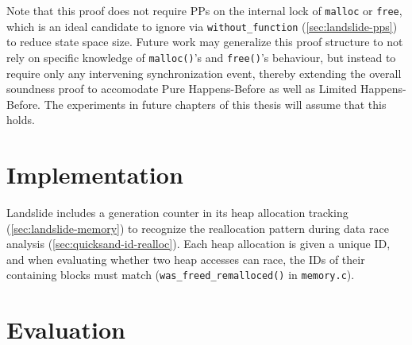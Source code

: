 Note that this proof does not require PPs on
the internal lock of {\tt malloc} or {\tt free},
which is an ideal candidate to ignore via {\tt without\_function} (\cref{sec:landslide-pps})
to reduce state space size.
Future work may generalize this proof structure to not rely on specific knowledge
of {\tt malloc()}'s and {\tt free()}'s behaviour,
but instead to require only any intervening synchronization event,
thereby extending the overall soundness proof to accomodate Pure Happens-Before as well as Limited Happens-Before.
The experiments in future chapters of this thesis will assume that this holds.


\section{Implementation}
\label{sec:quicksand-implementation}








Landslide includes a generation counter in its heap allocation tracking (\cref{sec:landslide-memory})
to recognize the reallocation pattern during data race analysis (\cref{sec:quicksand-id-realloc}).
Each heap allocation is given a unique ID,
and when evaluating whether two heap accesses can race,
the IDs of their containing blocks must match
({\tt was\_freed\_remalloced()} in {\tt memory.c}).




\section{Evaluation}
\label{sec:quicksand-eval}

